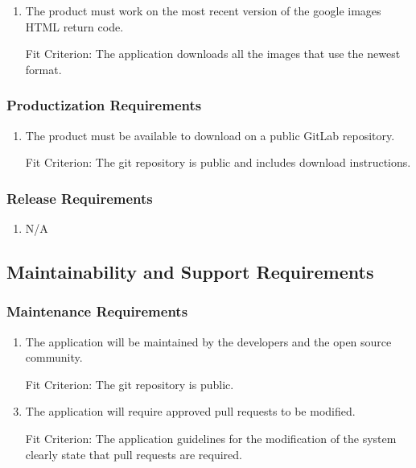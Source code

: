 \documentclass[12pt, titlepage]{article}
\begin{document}
\begin{enumerate}[label=IAR\arabic*:, wide=0pt, leftmargin=*]
    \item The product must work on the most recent version of the google images HTML return code.
    \item [Fit Criterion:] The application downloads all the images that use the newest format.
\end{enumerate}

\subsubsection{Productization Requirements}
\begin{enumerate}[label=PDR\arabic*:, wide=0pt, leftmargin=*]
    \item The product must be available to download on a public GitLab repository.
    \item [Fit Criterion:] The git repository is public and includes download instructions.
\end{enumerate}

\color{red}

\subsubsection{Release Requirements}

\begin{enumerate}[label=RER\arabic*:, wide=0pt, leftmargin=*]
    \item N/A
\end{enumerate}

\color{black}

\subsection{Maintainability and Support Requirements}

\subsubsection{Maintenance Requirements}
\begin{enumerate}[label=MSR\arabic*:, wide=0pt, leftmargin=*]
    \item The application will be maintained by the developers and the open source community.
    \item [Fit Criterion:] The git repository is public.
    \\
    \item The application will require approved pull requests to be modified.
    \item [Fit Criterion:] The application guidelines for the modification of the system clearly state that pull requests are required.
\end{enumerate}
\end{document}
